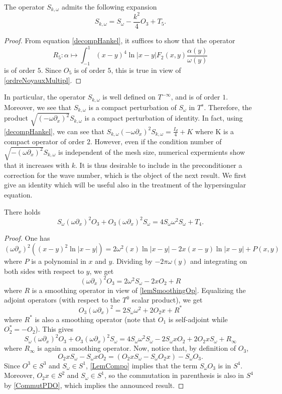 \documentclass[a4paper]{article}
\begin{document}
\begin{Lem}
	The operator $S_{k,\omega}$ admits the following expansion 
	\[ S_{k, \omega} = S_\omega - \frac{k^2}{4} O_3 +  T_5.\]
	\label{developpementHankel}
\end{Lem}
\begin{proof}
	From equation \eqref{decompHankel}, it suffices to show that the operator 
	\[R_5 : \alpha \mapsto \int_{-1}^{1} (x-y)^4 \ln|x - y|F_2(x,y)\frac{\alpha(y)}{\omega(y)}\]
	is of order $5$. Since $O_5$ is of order $5$, this is true in view of \autoref{ordreNoyauxMultipl}.
\end{proof}
In particular, the operator $S_{k,\omega}$ is well defined on $T^{-\infty}$, and is of order $1$. Moreover, we see that $S_{k,\omega}$ is a compact perturbation of $S_\omega$ in $T^s$. Therefore, the product $\sqrt{(-\omega \partial_x)^2}S_{k,\omega}$ is a compact perturbation of identity. In fact, using \autoref{decompHankel}, we can see that $S_{k,\omega}(- \omega \partial_x)^2 S_{k,\omega} = \frac{I_d}{4} + K$ where K is a compact operator of order $2$. However, even if the condition number of $\sqrt{-(\omega \partial_x)^2}S_{k,\omega}$ is independent of the mesh size, numerical expermients show that it increases with $k$. It is thus desirable to include in the preconditioner a correction for the wave number, which is the object of the next result. We first give an identity which will be useful also in the treatment of the hypersingular equation.
\begin{Lem}
	\label{LemSwDeltaO3}
	There holds
	\[S_\omega (\omega \partial_x)^2 O_3 + O_3(\omega \partial_x)^2 S_\omega = 4S_\omega\omega^2S_\omega + T_4.\]
\end{Lem}
\begin{proof}
	One has
	\[(\omega \partial_x)^2 \left((x - y)^2\ln|x-y|\right) = 2 \omega^2(x)\ln|x-y| -2x(x-y) \ln|x-y| + P(x,y)\]
	where $P$ is a polynomial in $x$ and $y$. Dividing by $-2\pi\omega(y)$ and integrating on both sides with respect to $y$, we get 
	\[(\omega \partial_x)^2 O_3 = 2 \omega^2 S_\omega - 2xO_2 + R \]
	where $R$ is a smoothing operator in view of \autoref{lemSmoothingOp}. Equalizing the adjoint operators  (with respect to the $T^0$ scalar product), we get
	\[O_3(\omega \partial_x)^2 = 2 S_\omega\omega^2 + 2O_2x + R^*\]
	where $R^*$ is also a smoothing operator (note that $O_1$ is self-adjoint while $O_2^* = - O_2$). This gives
	\[S_\omega (\omega \partial_x)^2 O_3 + O_3(\omega \partial_x)^2 S_\omega = 4S_\omega \omega^2S_\omega - 2S_\omega x O_2 + 2 O_2 x S_\omega + R_\infty\]
	where $R_\infty$ is again a smoothing operator. Now, notice that, by definition of $O_3$, 
	\[O_2 x S_\omega - S_\omega x O_2 = \left(O_2 x S_\omega - S_\omega O_2 x\right) -  S_\omega O_3.\]
	Since $O^3 \in S^3$ and $S_\omega \in S^1$, \autoref{LemCompo} implies that the term $S_\omega O_3$ is in $S^4$. Moreover, $O_2 x \in S^2$ and $S_\omega \in S^1$, so the commutation in parenthesis is also in $S^4$ by \autoref{CommutPDO}, which implies the announced result.
\end{proof}
\end{document}
